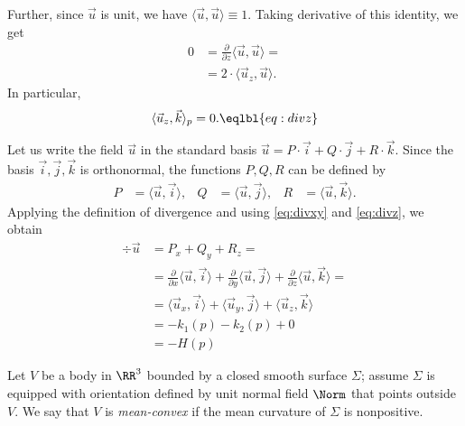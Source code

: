 Further, since $\vec u$ is unit, we have $\langle\vec u,\vec u\rangle\equiv 1$.
Taking derivative of this identity, we get
\begin{align*}
0&=\tfrac{\partial}{\partial z} \langle\vec u,\vec u\rangle=
\\
&=2\cdot \langle \vec u_z,\vec u\rangle.
\end{align*}
In particular,
\[\langle \vec u_z,\vec k\rangle_p=0.\eqlbl{eq:divz}\]

Let us write the field $\vec u$ in the standard basis 
$\vec u=P\cdot \vec i+Q\cdot\vec j+R\cdot\vec k$.
Since the basis $\vec i,\vec j,\vec k$ is orthonormal, the functions $P,Q,R$ can be defined by
\begin{align*}
P&=\langle\vec u,\vec i\rangle,
&
Q&=\langle\vec u,\vec j\rangle,
&
R&=\langle\vec u,\vec k\rangle.
\end{align*}
Applying the definition of divergence and using \ref{eq:divxy} and \ref{eq:divz}, we obtain
\begin{align*}
\div\vec u&=P_x+Q_y+R_z=
\\
&=\tfrac{\partial}{\partial x}\langle\vec u,\vec i \rangle
+
\tfrac{\partial}{\partial y}\langle\vec u,\vec j \rangle
+
\tfrac{\partial}{\partial z}\langle\vec u,\vec k\rangle
=
\\
&=\langle\vec u_x,\vec i \rangle
+
\langle \vec u_y,\vec j \rangle
+
\langle\vec u_z,\vec k \rangle
\\
&=-k_1(p)-k_2(p)+0
\\
&=-H(p)
\end{align*}
\qedsf

Let $V$ be a body in $\RR^3$ bounded by a closed smooth surface $\Sigma$;
assume $\Sigma$ is equipped with orientation defined by unit normal field $\Norm$ that points outside $V$.
We say that $V$ is \emph{mean-convex} if the mean curvature of $\Sigma$ is nonpositive.


